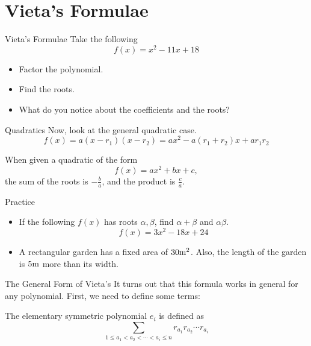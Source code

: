 \documentclass[aspectratio=169,xcolor=dvipsnames]{beamer}
\begin{document}
\section{Vieta's Formulae}

\begin{frame}{Vieta's Formulae}
    Take the following
    \[
    f(x)=x^2-11x+18
    \]
    
    \begin{itemize}
        \item Factor the polynomial.
        \item Find the roots.
        \item What do you notice about the coefficients and the roots?
    \end{itemize}
\end{frame}

\begin{frame}{Quadratics}
    Now, look at the general quadratic case.
    \[
    f(x)=a(x-r_1)(x-r_2)=ax^2-a(r_1+r_2)x+ar_1r_2
    \]
    
    \begin{theorem}
        When given a quadratic of the form
        \[f(x)=ax^2+bx+c,\]
        the sum of the roots is $-\frac ba$, and the product is $\frac ca$.
    \end{theorem}
\end{frame}

\begin{frame}{Practice}
    \begin{itemize}
        \item If the following \(f(x)\) has roots \(\alpha, \beta\), find \(\alpha+\beta\) and \(\alpha\beta\).
        \[f(x)=3x^2-18x+24\]
        \item A rectangular garden has a fixed area of \(30 \rm m^2\). Also, the length of the garden is \(5 \rm m\) more than its width. 
    \end{itemize}
\end{frame}

\begin{frame}{The General Form of Vieta's}
    It turns out that this formula works in general for any polynomial. First, we need to define some terms:
    \begin{definition}
        The elementary symmetric polynomial $e_i$ is defined as
        \[\sum_{1\le a_1<a_2<\cdots<a_i\le n}r_{a_1}r_{a_2}\cdots r_{a_i}\]     
        
    \end{definition}
\end{frame}
\end{document}
